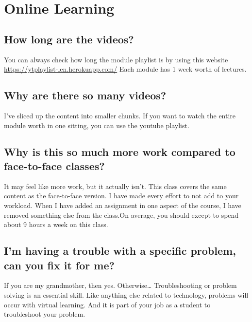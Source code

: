 \hypertarget{online-learning}{%
\section{Online Learning}\label{online-learning}}

\hypertarget{how-long-are-the-videos}{%
\subsection{How long are the videos?}\label{how-long-are-the-videos}}

You can always check how long the module playlist is by using this website \url{https://ytplaylist-len.herokuapp.com/}
Each module has 1 week worth of lectures.

\hypertarget{why-are-there-so-many-videos}{%
\subsection{Why are there so many videos?}\label{why-are-there-so-many-videos}}

I've sliced up the content into smaller chunks.
If you want to watch the entire module worth in one sitting, you can use the youtube playlist.

\hypertarget{why-is-this-so-much-more-work-compared-to-face-to-face-classes}{%
\subsection{Why is this so much more work compared to face-to-face classes?}\label{why-is-this-so-much-more-work-compared-to-face-to-face-classes}}

It may feel like more work, but it actually isn't. This class covers the same content as the face-to-face version. I have made every effort to not add to your workload. When I have added an assignment in one aspect of the course, I have removed something else from the class.On average, you should except to spend about 9 hours a week on this class.

\hypertarget{im-having-a-trouble-with-a-specific-problem-can-you-fix-it-for-me}{%
\subsection{I'm having a trouble with a specific problem, can you fix it for me?}\label{im-having-a-trouble-with-a-specific-problem-can-you-fix-it-for-me}}

If you are my grandmother, then yes. Otherwise\ldots{} Troubleshooting or problem solving is an essential skill. Like anything else related to technology, problems will occur with virtual learning. And it is part of your job as a student to troubleshoot your problem.

